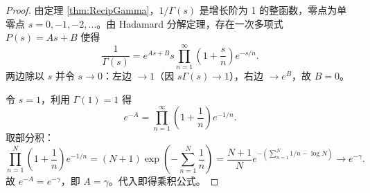 \documentclass[UTF8]{ctexart}
\numberwithin{equation}{section}
\begin{document}
\begin{proof}
由定理 \ref{thm:RecipGamma}，\(1/\Gamma(s)\) 是增长阶为 1 的整函数，零点为单零点 \(s=0,-1,-2,\dots\)。由 Hadamard 分解定理，存在一次多项式 \(P(s)=As+B\) 使得
\[
\frac{1}{\Gamma(s)} = e^{As+B} s \prod_{n=1}^{\infty} \left(1+\frac{s}{n}\right) e^{-s/n}.
\]
两边除以 \(s\) 并令 \(s\to0\)：左边 \(\to1\)（因 \(s\Gamma(s)\to1\)），右边 \(\to e^{B}\)，故 \(B=0\)。

令 \(s=1\)，利用 \(\Gamma(1)=1\) 得
\[
e^{-A} = \prod_{n=1}^{\infty} \left(1+\frac{1}{n}\right) e^{-1/n}.
\]
取部分积：
\[
\prod_{n=1}^{N} \left(1+\frac{1}{n}\right) e^{-1/n}
= (N+1) \exp\!\left(-\sum_{n=1}^{N}\frac{1}{n}\right)
= \frac{N+1}{N} e^{-(\sum_{n=1}^{N}1/n - \log N)} \to e^{-\gamma}.
\]
故 \(e^{-A}=e^{-\gamma}\)，即 \(A=\gamma\)。代入即得乘积公式。
\end{proof}
\end{document}
